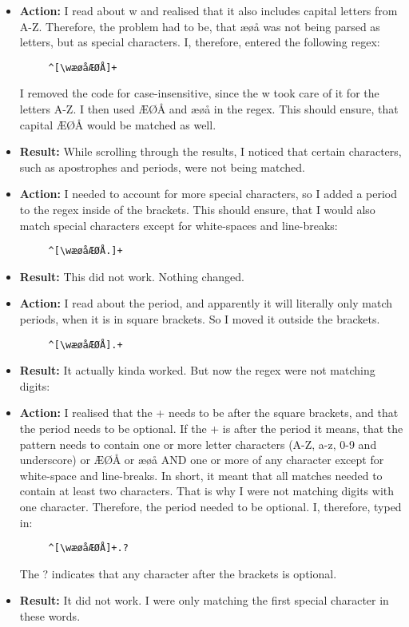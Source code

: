 \documentclass{article}
\begin{document}
\begin{itemize}
\item \textbf{Action:} I read about w and realised that it also includes capital letters from A-Z. Therefore, the problem had to be, that æøå was not being parsed as letters, but as special characters. I, therefore, entered the following regex:
\begin{verbatim}
     ^[\wæøåÆØÅ]+
\end{verbatim}
I removed the code for case-insensitive, since the w took care of it for the letters A-Z. I then used ÆØÅ and æøå in the regex. This should ensure, that capital ÆØÅ would be matched as well.
\item \textbf{Result:} While scrolling through the results, I noticed that certain characters, such as apostrophes and periods, were not being matched. 

\item \textbf{Action:} I needed to account for more special characters, so I added a period to the regex inside of the brackets. This should ensure, that I would also match special characters except for white-spaces and line-breaks:
\begin{verbatim}
     ^[\wæøåÆØÅ.]+
\end{verbatim}
\item \textbf{Result:} This did not work. Nothing changed.

\item \textbf{Action:} I read about the period, and apparently it will literally only match periods, when it is in square brackets. So I moved it outside the brackets.
\begin{verbatim}
     ^[\wæøåÆØÅ].+
\end{verbatim}
\item \textbf{Result:} It actually kinda worked. But now the regex were not matching digits: 

\item \textbf{Action:} I realised that the + needs to be after the square brackets, and that the period needs to be optional. If the + is after the period it means, that the pattern needs to contain one or more letter characters (A-Z, a-z, 0-9 and underscore) or ÆØÅ or æøå AND one or more of any character except for white-space and line-breaks. In short, it meant that all matches needed to contain at least two characters. That is why I were not matching digits with one character. Therefore, the period needed to be optional. I, therefore, typed in: 
\begin{verbatim}
     ^[\wæøåÆØÅ]+.?
\end{verbatim}
The ? indicates that any character after the brackets is optional. 
\item \textbf{Result:} It did not work. I were only matching the first special character in these words.


\end{itemize}
\end{document}
